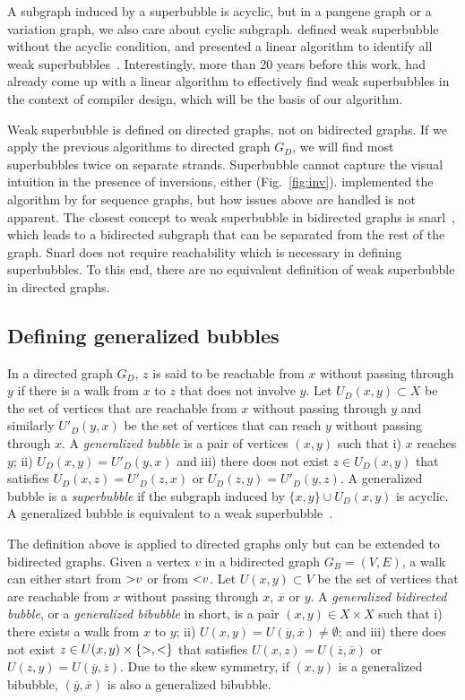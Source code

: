 \documentclass[webpdf,contemporary,large,namedate]{oup-authoring-template}%
\begin{document}
A subgraph induced by a superbubble is acyclic, but in a pangene graph or a variation graph,
we also care about cyclic subgraph.
\citet{Gartner:2018aa} defined weak superbubble without the acyclic condition,
and presented a linear algorithm to identify all weak superbubbles~\citep{DBLP:journals/algorithms/GartnerS19}.
Interestingly, more than 20 years before this work,
\citet{DBLP:conf/pldi/JohnsonPP94} had already come up with a linear algorithm to effectively find weak superbubbles in the context of compiler design,
which will be the basis of our algorithm.

Weak superbubble is defined on directed graphs, not on bidirected graphs.
If we apply the previous algorithms to directed graph $G_D$,
we will find most superbubbles twice on separate strands.
Superbubble cannot capture the visual intuition in the presence of inversions, either (Fig.~\ref{fig:inv}).
\citet{Dabbaghie:2022aa} implemented the algorithm by \citet{DBLP:conf/wabi/OnoderaSS13} for sequence graphs,
but how issues above are handled is not apparent.
The closest concept to weak superbubble in bidirected graphs is snarl~\citep{Paten:2018aa},
which leads to a bidirected subgraph that can be separated from the rest of the graph.
Snarl does not require reachability which is necessary in defining superbubbles.
To this end, there are no equivalent definition of weak superbubble in directed graphs.

\subsection{Defining generalized bubbles}

In a directed graph $G_D$, $z$ is said to be reachable from $x$ without passing through $y$
if there is a walk from $x$ to $z$ that does not involve $y$.
Let $U_D(x,y)\subset X$ be the set of vertices that are reachable from $x$ without passing through $y$
and similarly $U'_D(y,x)$ be the set of vertices that can reach $y$ without passing through $x$.
A \emph{generalized bubble} is a pair of vertices $(x,y)$ such that
i) $x$ reaches $y$; ii) $U_D(x,y)=U'_D(y,x)$ and iii) there does not exist $z\in U_D(x,y)$
that satisfies $U_D(x,z)=U'_D(z,x)$ or $U_D(z,y)=U'_D(y,z)$.
A generalized bubble is a \emph{superbubble} if the subgraph induced by $\{x,y\}\cup U_D(x,y)$ is acyclic.
A generalized bubble is equivalent to a weak superbubble~\citep{Gartner:2018aa}.

The definition above is applied to directed graphs only but can be extended to bidirected graphs.
Given a vertex $v$ in a bidirected graph $G_B=(V,E)$,
a walk can either start from ${\rm >}v$ or from ${\rm <}v$.
Let $U(x,y)\subset V$ be the set of vertices that are reachable from $x$ without passing through $x$, $\overline{x}$ or $y$.
A \emph{generalized bidirected bubble}, or a \emph{generalized bibubble} in short, is a pair $(x,y)\in X\times X$ such that
i) there exists a walk from $x$ to $y$;
ii) $U(x,y)=U(\overline{y},\overline{x})\not=\emptyset$;
and iii) there does not exist $z\in U(x,y)\times\{{\rm >},{\rm <}\}$
that satisfies $U(x,z)=U(\overline{z},\overline{x})$ or $U(z,y)=U(\overline{y},\overline{z})$.
Due to the skew symmetry, if $(x,y)$ is a generalized bibubble, $(\overline{y},\overline{x})$ is also a generalized bibubble.
\end{document}
